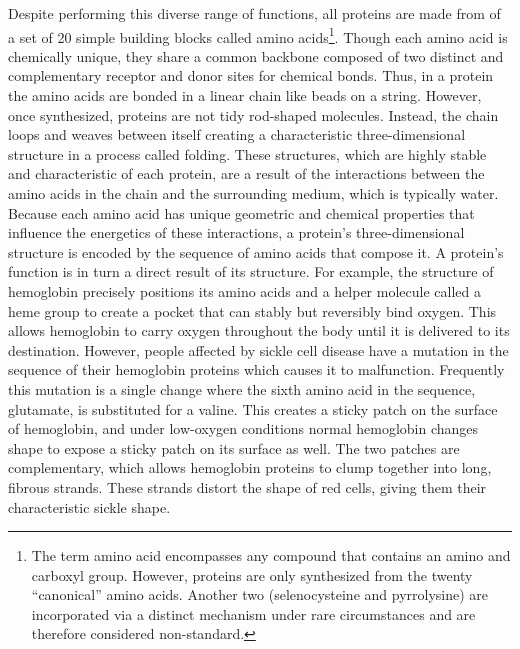 Despite performing this diverse range of functions, all proteins are made from of a set of 20 simple building blocks called amino acids\footnote{The term amino acid encompasses any compound that contains an amino and carboxyl group. However, proteins are only synthesized from the twenty ``canonical'' amino acids. Another two (selenocysteine and pyrrolysine) are incorporated via a distinct mechanism under rare circumstances and are therefore considered non-standard.}. Though each amino acid is chemically unique, they share a common backbone composed of two distinct and complementary receptor and donor sites for chemical bonds. Thus, in a protein the amino acids are bonded in a linear chain like beads on a string. However, once synthesized, proteins are not tidy rod-shaped molecules. Instead, the chain loops and weaves between itself creating a characteristic three-dimensional structure in a process called folding. These structures, which are highly stable and characteristic of each protein, are a result of the interactions between the amino acids in the chain and the surrounding medium, which is typically water. Because each amino acid has unique geometric and chemical properties that influence the energetics of these interactions, a protein's three-dimensional structure is encoded by the sequence of amino acids that compose it. A protein's function is in turn a direct result of its structure. For example, the structure of hemoglobin precisely positions its amino acids and a helper molecule called a heme group to create a pocket that can stably but reversibly bind oxygen. This allows hemoglobin to carry oxygen throughout the body until it is delivered to its destination. However, people affected by sickle cell disease have a mutation in the sequence of their hemoglobin proteins which causes it to malfunction. Frequently this mutation is a single change where the sixth amino acid in the sequence, glutamate, is substituted for a valine. This creates a sticky patch on the surface of hemoglobin, and under low-oxygen conditions normal hemoglobin changes shape to expose a sticky patch on its surface as well. The two patches are complementary, which allows hemoglobin proteins to clump together into long, fibrous strands. These strands distort the shape of red cells, giving them their characteristic sickle shape.

